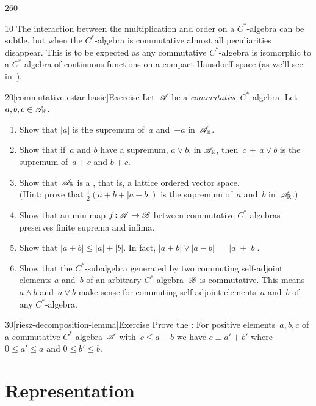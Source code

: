\begin{parsec}{260}%
\begin{point}{10}%
The interaction between the multiplication and order
on a $C^*$-algebra can be subtle,
but
when the $C^*$-algebra is commutative
almost all peculiarities disappear.
This is to be expected
as any commutative $C^*$-algebra
is isomorphic to a $C^*$-algebra
of continuous functions on a compact Hausdorff space
(as we'll see in~).
\end{point}
\begin{point}{20}[commutative-cstar-basic]{Exercise}%
Let~$\mathscr{A}$ be a \emph{commutative} $C^*$-algebra.
Let~$a,b,c\in\mathscr{A}_{\mathbb{R}}$.
\begin{enumerate}
\item
Show that $\left| a\right|$ is the supremum of~$a$ and~$-a$
in~$\mathscr{A}_{\mathbb{R}}$.
\item
Show that if~$a$ and $b$ have a supremum, $a\vee b$, in $\mathscr{A}_{\mathbb{R}}$,
then~$c\,+\,a\vee b$ is the supremum of~$a+c$ and $b+c$.
\item
Show that~$\mathscr{A}_{\mathbb{R}}$ is a ,
that is,  a lattice ordered vector space.\\
(Hint: prove that $\frac{1}{2}(a+b+\left|a-b\right|)$
is the supremum of~$a$ and~$b$ in~$\mathscr{A}_{\mathbb{R}}$.)
\item
Show that an miu-map $f\colon \mathscr{A}\to\mathscr{B}$
between commutative $C^*$-algebras
preserves finite suprema and infima.
\item
Show that $\left|a+b\right|\leq \left|a\right|+\left|b\right|$.
In fact,
$\left|a+b\right|\vee\left|a-b\right|
\,=\,\left|a\right|+\left|b\right|$.
\item
Show that the $C^*$-subalgebra generated by two commuting
self-adjoint elements $a$ and~$b$ of an arbitrary $C^*$-algebra~$\mathscr{B}$ is commutative.
This means~$a\wedge b$ and~$a\vee b$ make sense
for commuting self-adjoint elements~$a$ and~$b$
of any $C^*$-algebra.
\end{enumerate}%
\spacingfix%
\end{point}%
\begin{point}{30}[riesz-decomposition-lemma]{Exercise}%
Prove the :%
For positive elements~$a,b,c$ of a commutative $C^*$-algebra~$\mathscr{A}$
with~$c\leq a+b$
we have $c\equiv a'+b'$
where  $0\leq a'\leq a$ and $0\leq b'\leq b$.
\end{point}
\end{parsec}
\section{Representation}
